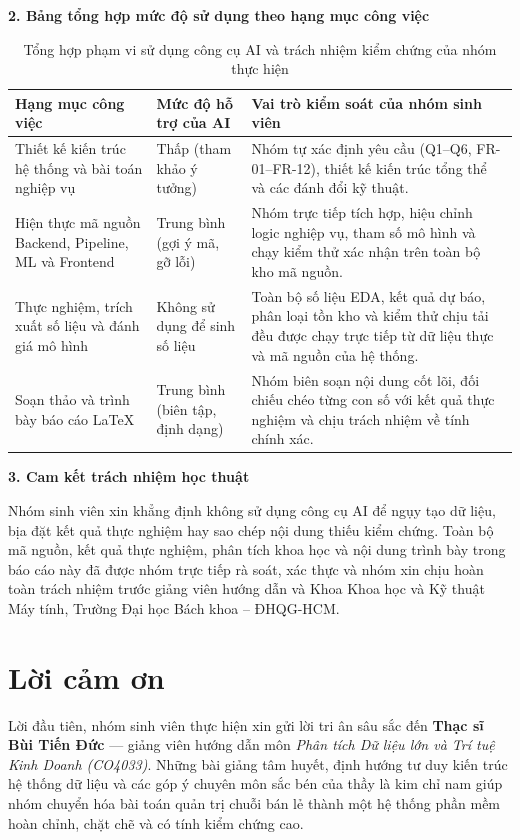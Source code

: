 \medskip
\noindent\textbf{2. Bảng tổng hợp mức độ sử dụng theo hạng mục công việc}
\begin{table}[H]
	\centering
	\small
	\begin{tabular}{p{4.5cm} p{4.2cm} p{6.8cm}}
		\toprule
		\textbf{Hạng mục công việc}                          & \textbf{Mức độ hỗ trợ của AI}    & \textbf{Vai trò kiểm soát của nhóm sinh viên}                                                                                                 \\
		\midrule
		Thiết kế kiến trúc hệ thống và bài toán nghiệp vụ    & Thấp (tham khảo ý tưởng)         & Nhóm tự xác định yêu cầu (Q1--Q6, FR-01--FR-12), thiết kế kiến trúc tổng thể và các đánh đổi kỹ thuật.                                        \\
		Hiện thực mã nguồn Backend, Pipeline, ML và Frontend & Trung bình (gợi ý mã, gỡ lỗi)    & Nhóm trực tiếp tích hợp, hiệu chỉnh logic nghiệp vụ, tham số mô hình và chạy kiểm thử xác nhận trên toàn bộ kho mã nguồn.                     \\
		Thực nghiệm, trích xuất số liệu và đánh giá mô hình  & Không sử dụng để sinh số liệu    & Toàn bộ số liệu EDA, kết quả dự báo, phân loại tồn kho và kiểm thử chịu tải đều được chạy trực tiếp từ dữ liệu thực và mã nguồn của hệ thống. \\
		Soạn thảo và trình bày báo cáo \LaTeX{}              & Trung bình (biên tập, định dạng) & Nhóm biên soạn nội dung cốt lõi, đối chiếu chéo từng con số với kết quả thực nghiệm và chịu trách nhiệm về tính chính xác.                    \\
		\bottomrule
	\end{tabular}
	\caption{Tổng hợp phạm vi sử dụng công cụ AI và trách nhiệm kiểm chứng của nhóm thực hiện}
	\label{tab:ai-use-statement}
\end{table}

\medskip
\noindent\textbf{3. Cam kết trách nhiệm học thuật}

Nhóm sinh viên xin khẳng định không sử dụng công cụ AI để ngụy tạo dữ liệu, bịa đặt kết quả thực nghiệm hay sao chép nội dung thiếu kiểm chứng. Toàn bộ mã nguồn, kết quả thực nghiệm, phân tích khoa học và nội dung trình bày trong báo cáo này đã được nhóm trực tiếp rà soát, xác thực và nhóm xin chịu hoàn toàn trách nhiệm trước giảng viên hướng dẫn và Khoa Khoa học và Kỹ thuật Máy tính, Trường Đại học Bách khoa -- ĐHQG-HCM.

\newpage\part*{Lời cảm ơn}
Lời đầu tiên, nhóm sinh viên thực hiện xin gửi lời tri ân sâu sắc đến \textbf{Thạc sĩ Bùi Tiến Đức} --- giảng viên hướng dẫn môn \textit{Phân tích Dữ liệu lớn và Trí tuệ Kinh Doanh (CO4033)}. Những bài giảng tâm huyết, định hướng tư duy kiến trúc hệ thống dữ liệu và các góp ý chuyên môn sắc bén của thầy là kim chỉ nam giúp nhóm chuyển hóa bài toán quản trị chuỗi bán lẻ thành một hệ thống phần mềm hoàn chỉnh, chặt chẽ và có tính kiểm chứng cao.

